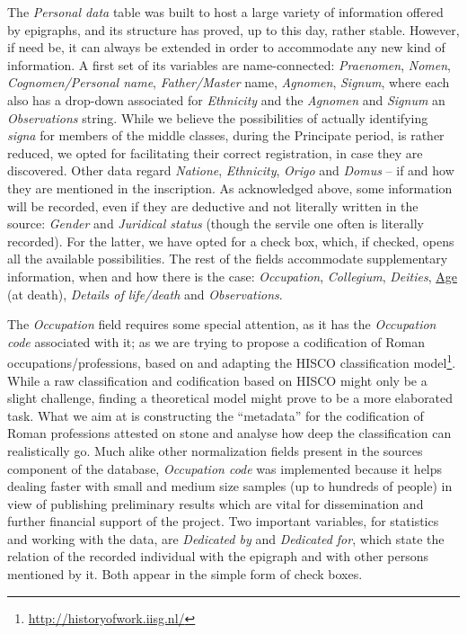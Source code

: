 \documentclass[amsthm,ebook]{saparticle}
\begin{document}
The \emph{Personal data} table was built to host a large variety of information offered by epigraphs, and its structure has
proved, up to this day, rather stable. However, if need be, it can always be extended in order to accommodate any new
kind of information. A first set of its variables are name-connected: \emph{Praenomen}, \emph{Nomen}, \emph{Cognomen/Personal name},
\emph{Father/Master} name, \emph{Agnomen}, \emph{Signum}, where each also has a drop-down associated for \emph{Ethnicity} and the \emph{Agnomen} and
\emph{Signum} an \emph{Observations} string. While we believe the possibilities of actually identifying \emph{signa} for members of the
middle classes, during the Principate period, is rather reduced, we opted for facilitating their correct registration,
in case they are discovered. Other data regard \emph{Natione}, \emph{Ethnicity}, \emph{Origo} and \emph{Domus} – if and how they are mentioned in
the inscription. As acknowledged above, some information will be recorded, even if they are deductive and not literally
written in the source: \emph{Gender} and \emph{Juridical status} (though the servile one often is literally recorded). For the
latter, we have opted for a check box, which, if checked, opens all the available possibilities. The rest of the fields
accommodate supplementary information, when and how there is the case: \emph{Occupation}, \emph{Collegium}, \emph{Deities}, \underline{Age} (at death),
\emph{Details of life/death} and \emph{Observations}. 

The \emph{Occupation} field requires some special attention, as it has the \emph{Occupation code} associated with it; as we are trying
to propose a codification of Roman occupations/professions, based on and adapting the HISCO classification
model\footnote{\url{http://historyofwork.iisg.nl/} }. While a raw classification and codification based on HISCO might only
be a slight challenge, finding a theoretical model might prove to be a more elaborated task. What we aim at is
constructing the ``metadata'' for the codification of Roman professions attested on stone and analyse how deep the
classification can realistically go. Much alike other normalization fields present in the sources component of the
database, \emph{Occupation code} was implemented because it helps dealing faster with small and medium size samples (up to
hundreds of people) in view of publishing preliminary results which are vital for dissemination and further financial
support of the project. 
\newpage
Two important variables, for statistics and working with the data, are \emph{Dedicated by} and \emph{Dedicated for}, which state the
relation of the recorded individual with the epigraph and with other persons mentioned by it. Both appear in the simple
form of check boxes. 
\end{document}
